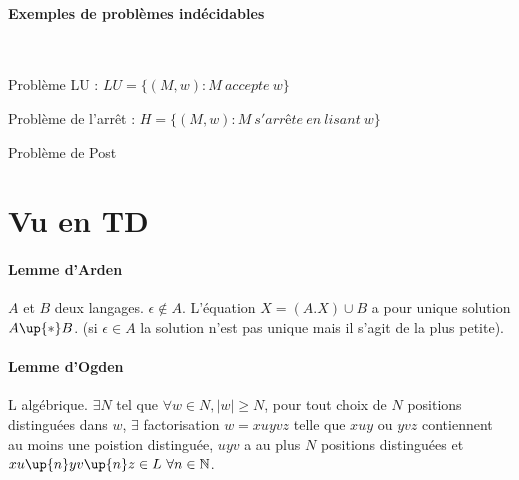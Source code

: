 \documentclass[french]{article}
\begin{document}
\paragraph{Exemples de problèmes indécidables}~

Problème LU : \( LU = \lbrace (M,w) : M~accepte~w \rbrace	 \)

Problème de l'arrêt : \(  H = \lbrace (M,w) : M~s'arrête~en~lisant~w \rbrace  \)

Problème de Post



\section{Vu en TD}
\paragraph{Lemme d'Arden}
$A$ et $B$ deux langages. $\epsilon \not\in A$. L'équation $X = (A.X)\cup B$ a pour unique solution $A\up{*}B$. (si $\epsilon \in A$ la solution n'est pas unique mais il s'agit de la plus petite).

\paragraph{Lemme d'Ogden}
L algébrique. $\exists N$ tel que $\forall w\in N, |w|\geq N$, pour tout choix de $N$ positions distinguées dans $w$, $\exists$ factorisation $w=xuyvz$ telle que $xuy$ ou $yvz$ contiennent au moins une poistion distinguée, $uyv$ a au plus $N$ positions distinguées et $xu\up{n}yv\up{n}z\in L\ \forall n\in\mathbb{N}$.
\end{document}

